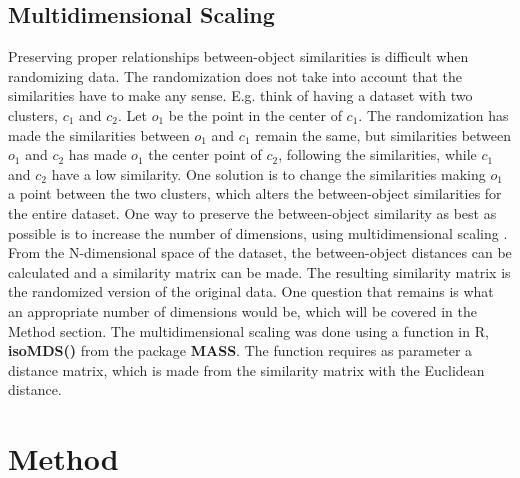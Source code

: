 \documentclass[a4paper,10pt]{article}
\theoremstyle{plain}
\theoremstyle{definition}
\begin{document}
\subsection{Multidimensional Scaling}
Preserving proper relationships between-object similarities is difficult when randomizing data. The randomization does not take into account that the similarities have to make any sense. E.g. think of having a dataset with two clusters, $c_1$ and $c_2$. Let $o_1$ be the point in the center of $c_1$. The randomization has made the similarities between $o_1$ and $c_1$ remain the same, but similarities between $o_1$ and $c_2$ has made $o_1$ the center point of $c_2$, following the similarities, while $c_1$ and $c_2$ have a low similarity. One solution is to change the similarities making $o_1$ a point between the two clusters, which alters the between-object similarities for the entire dataset. One way to preserve the between-object similarity as best as possible is to increase the number of dimensions, using multidimensional scaling \cite{powerLimits}. From the N-dimensional space of the dataset, the between-object distances can be calculated and a similarity matrix can be made. The resulting similarity matrix is the randomized version of the original data. One question that remains is what an appropriate number of dimensions would be, which will be covered in the Method section. The multidimensional scaling was done using a function in R, \textbf{isoMDS()} from the package \textbf{MASS}. The function requires as parameter a distance matrix, which is made from the similarity matrix with the Euclidean distance.


\newpage
\section{Method}

\end{document}
